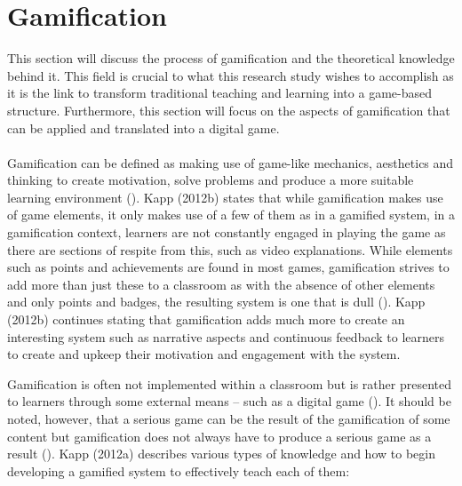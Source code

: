 \section{Gamification}
This section will discuss the process of gamification and the theoretical knowledge behind it. This field is crucial to what this research study wishes to accomplish as it is the link to transform traditional teaching and learning into a game-based structure. Furthermore, this section will focus on the aspects of gamification that can be applied and translated into a digital game. 
\\\\
Gamification can be defined as making use of game-like mechanics, aesthetics and thinking to create motivation, solve problems and produce a more suitable learning environment (\cite{Kapp2012a}). Kapp (2012b) states that while gamification makes use of game elements, it only makes use of a few of them as in a gamified system, in a gamification context, learners are not constantly engaged in playing the game as there are sections of respite from this, such as video explanations. While elements such as points and achievements are found in most games, gamification strives to add more than just these to a classroom as with the absence of other elements and only points and badges, the resulting system is one that is dull (\cite{KappArticle2012}). Kapp (2012b) continues stating that gamification adds much more to create an interesting system such as narrative aspects and continuous feedback to learners to create and upkeep their motivation and engagement with the system.

Gamification is often not implemented within a classroom but is rather presented to learners through some external means – such as a digital game (\cite{KappArticle2012}). It should be noted, however, that a serious game can be the result of the gamification of some content but gamification does not always have to produce a serious game as a result (\cite{KappArticle2012}).  Kapp (2012a) describes various types of knowledge and how to begin developing a gamified system to effectively teach each of them:

